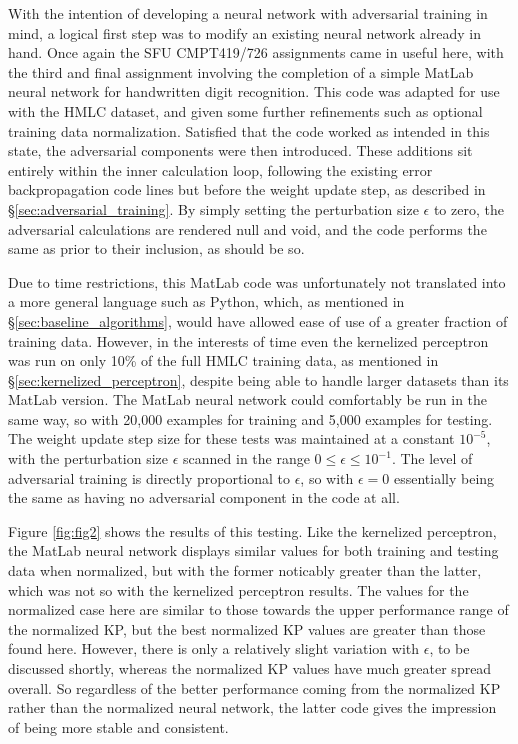 \documentclass          {article} %
\begin{document}
With the intention of developing a neural network with adversarial training in mind, a logical first step was to modify an existing neural network already in hand. Once again the SFU CMPT419/726 assignments came in useful here, with the third and final assignment involving the completion of a simple MatLab neural network for handwritten digit recognition. This code was adapted for use with the HMLC dataset, and given some further refinements such as optional training data normalization. Satisfied that the code worked as intended in this state, the adversarial components were then introduced. These additions sit entirely within the inner calculation loop, following the existing error backpropagation code lines but before the weight update step, as described in \S\ref{sec:adversarial_training}. By simply setting the perturbation size $\epsilon$ to zero, the adversarial calculations are rendered null and void, and the code performs the same as prior to their inclusion, as should be so.

Due to time restrictions, this MatLab code was unfortunately not translated into a more general language such as Python, which, as mentioned in \S\ref{sec:baseline_algorithms}, would have allowed ease of use of a greater fraction of training data. However, in the interests of time even the kernelized perceptron was run on only 10\% of the full HMLC training data, as mentioned in \S\ref{sec:kernelized_perceptron}, despite being able to handle larger datasets than its MatLab version. The MatLab neural network could comfortably be run in the same way, so with 20,000 examples for training and 5,000 examples for testing. The weight update step size for these tests was maintained at a constant $10^{-5}$, with the perturbation size $\epsilon$ scanned in the range $0\le\epsilon\le10^{-1}$. The level of adversarial training is directly proportional to $\epsilon$, so with $\epsilon=0$ essentially being the same as having no adversarial component in the code at all.

Figure \ref{fig:fig2} shows the results of this testing. Like the kernelized perceptron, the MatLab neural network displays similar values for both training and testing data when normalized, but with the former noticably greater than the latter, which was not so with the kernelized perceptron results. The values for the normalized case here are similar to those towards the upper performance range of the normalized KP, but the best normalized KP values are greater than those found here. However, there is only a relatively slight variation with $\epsilon$, to be discussed shortly, whereas the normalized KP values have much greater spread overall. So regardless of the better performance coming from the normalized KP rather than the normalized neural network, the latter code gives the impression of being more stable and consistent.
\end{document}
